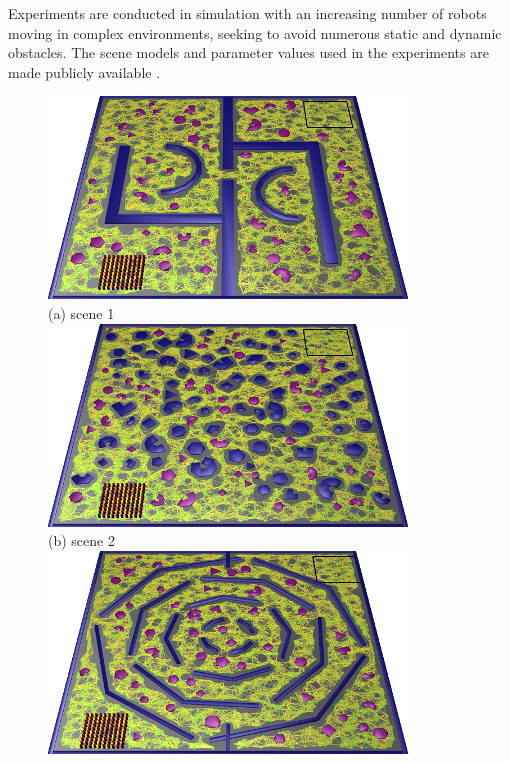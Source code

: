 \documentclass[letterpaper, 10pt, conference]{ieeeconf}
\begin{document}
Experiments are conducted in simulation with an increasing number of
robots moving in complex environments, seeking to avoid numerous
static and dynamic obstacles. The scene models and parameter values used in the
experiments are made publicly available \cite{dCrops}.

\begin{figure}
\centering
\includegraphics[width=\columnwidth]{usef/figA_PRM_scaled.jpg}\\
(a) scene 1 \\
\includegraphics[width=\columnwidth]{usef/figB_PRM_scaled.jpg}\\
(b) scene 2 \\
\includegraphics[width=\columnwidth]{usef/figC_PRM_scaled.jpg} \\

\end{figure}
\end{document}
